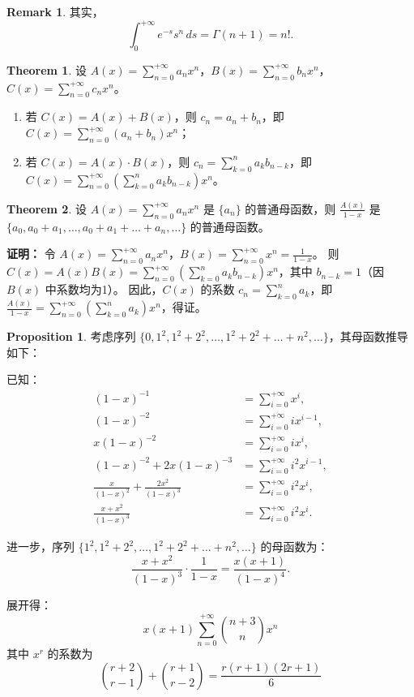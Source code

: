 \documentclass[oneside]{book}
\theoremstyle{definition}
\newtheorem{proposition}{Proposition}[section]
\newtheorem{theorem}{Theorem}[section]
\newtheorem{remark}{Remark}[section]
\begin{document}
\begin{remark}
	其实，\[\int_0^{+\infty} e^{-s} s^n \, ds=\Gamma(n+1)=n!.
	\]
\end{remark}
\begin{theorem}
设 \( A(x) = \sum_{n=0}^{+\infty} a_n x^n \)，\( B(x) = \sum_{n=0}^{+\infty} b_n x^n \)，\( C(x) = \sum_{n=0}^{+\infty} c_n x^n \)。
\begin{enumerate}
	\item 若 \( C(x) = A(x) + B(x) \)，则 \( c_n = a_n + b_n \)，即 \( C(x) = \sum_{n=0}^{+\infty} (a_n + b_n) x^n \)；
	\item 若 \( C(x) = A(x) \cdot B(x) \)，则 \( c_n = \sum_{k=0}^{n} a_k b_{n-k} \)，即 \( C(x) = \sum_{n=0}^{+\infty} \left( \sum_{k=0}^{n} a_k b_{n-k} \right) x^n \)。
\end{enumerate}
\end{theorem}
	
	\begin{theorem}
		设 \( A(x) = \sum_{n=0}^{+\infty} a_n x^n \) 是 \( \{a_n\} \) 的普通母函数，则 \( \frac{A(x)}{1-x} \) 是 \( \{a_0, a_0+a_1, \dots, a_0+a_1+\dots+a_n, \dots\} \) 的普通母函数。
		
		\textbf{证明：} 令 \( A(x) = \sum_{n=0}^{+\infty} a_n x^n \)，\( B(x) = \sum_{n=0}^{+\infty} x^n = \frac{1}{1-x} \)。
		则 \( C(x) = A(x)B(x) = \sum_{n=0}^{+\infty} \left( \sum_{k=0}^{n} a_k b_{n-k} \right) x^n \)，其中 \( b_{n-k} = 1 \)（因 \( B(x) \) 中系数均为1）。
		因此，\( C(x) \) 的系数 \( c_n = \sum_{k=0}^{n} a_k \)，即 \( \frac{A(x)}{1-x} = \sum_{n=0}^{+\infty} \left( \sum_{k=0}^{n} a_k \right) x^n \)，得证。
	\end{theorem}
	
	\begin{proposition}
		考虑序列 \( \{0, 1^2, 1^2+2^2, \dots, 1^2+2^2+\dots+n^2, \dots\} \)，其母函数推导如下：
		
		已知：
		\[
		\begin{aligned}
			(1-x)^{-1} &= \sum_{i=0}^{+\infty} x^i, \\
			(1-x)^{-2} &= \sum_{i=0}^{+\infty} i x^{i-1}, \\
			x(1-x)^{-2} &= \sum_{i=0}^{+\infty} i x^i, \\
			(1-x)^{-2} + 2x(1-x)^{-3} &= \sum_{i=0}^{+\infty} i^2 x^{i-1}, \\
			\frac{x}{(1-x)^2} + \frac{2x^2}{(1-x)^3} &= \sum_{i=0}^{+\infty} i^2 x^i, \\
			\frac{x + x^2}{(1-x)^3} &= \sum_{i=0}^{+\infty} i^2 x^i.
		\end{aligned}
		\]
		
		进一步，序列 \( \{1^2, 1^2+2^2, \dots, 1^2+2^2+\dots+n^2, \dots\} \) 的母函数为：
		\[
		\frac{x + x^2}{(1-x)^3} \cdot \frac{1}{1-x} = \frac{x(x + 1)}{(1-x)^4}.
		\]
		
		展开得：
		\[
		x(x + 1) \sum_{n=0}^{+\infty} \binom{n+3}{n} x^n
		\]
		其中 \( x^r \) 的系数为 
		\[ \binom{r+2}{r-1} + \binom{r+1}{r-2} = \frac{r(r+1)(2r+1)}{6} \]
	\end{proposition}
\end{document}
